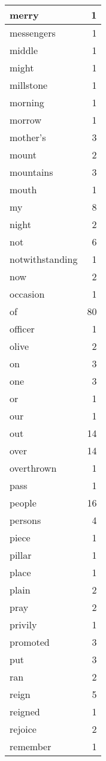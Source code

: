 \begin{center}
\begin{longtable}{l|r}
merry & 1\\ \hline 
messengers & 1\\ \hline 
middle & 1\\ \hline 
might & 1\\ \hline 
millstone & 1\\ \hline 
morning & 1\\ \hline 
morrow & 1\\ \hline 
mother's & 3\\ \hline 
mount & 2\\ \hline 
mountains & 3\\ \hline 
mouth & 1\\ \hline 
my & 8\\ \hline 
night & 2\\ \hline 
not & 6\\ \hline 
notwithstanding & 1\\ \hline 
now & 2\\ \hline 
occasion & 1\\ \hline 
of & 80\\ \hline 
officer & 1\\ \hline 
olive & 2\\ \hline 
on & 3\\ \hline 
one & 3\\ \hline 
or & 1\\ \hline 
our & 1\\ \hline 
out & 14\\ \hline 
over & 14\\ \hline 
overthrown & 1\\ \hline 
pass & 1\\ \hline 
people & 16\\ \hline 
persons & 4\\ \hline 
piece & 1\\ \hline 
pillar & 1\\ \hline 
place & 1\\ \hline 
plain & 2\\ \hline 
pray & 2\\ \hline 
privily & 1\\ \hline 
promoted & 3\\ \hline 
put & 3\\ \hline 
ran & 2\\ \hline 
reign & 5\\ \hline 
reigned & 1\\ \hline 
rejoice & 2\\ \hline 
remember & 1\\ \hline 

\end{longtable}
\end{center}
